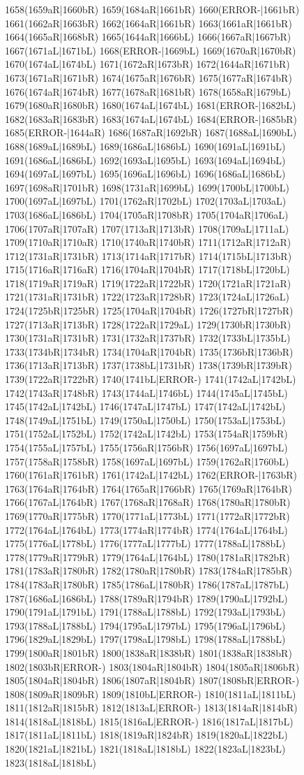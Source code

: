 1658(1659aR|1660bR) 1659(1684aR|1661bR) 1660(ERROR-|1661bR) 1661(1662aR|1663bR) 1662(1664aR|1661bR) 1663(1661aR|1661bR) 1664(1665aR|1668bR) 1665(1644aR|1666bL) 1666(1667aR|1667bR) 1667(1671aL|1671bL) 1668(ERROR-|1669bL) 1669(1670aR|1670bR) 1670(1674aL|1674bL) 1671(1672aR|1673bR) 1672(1644aR|1671bR) 1673(1671aR|1671bR) 1674(1675aR|1676bR) 1675(1677aR|1674bR) 1676(1674aR|1674bR) 1677(1678aR|1681bR) 1678(1658aR|1679bL) 1679(1680aR|1680bR) 1680(1674aL|1674bL) 1681(ERROR-|1682bL) 1682(1683aR|1683bR) 1683(1674aL|1674bL) 1684(ERROR-|1685bR) 1685(ERROR-|1644aR) 1686(1687aR|1692bR) 1687(1688aL|1690bL) 1688(1689aL|1689bL) 1689(1686aL|1686bL) 1690(1691aL|1691bL) 1691(1686aL|1686bL) 1692(1693aL|1695bL) 1693(1694aL|1694bL) 1694(1697aL|1697bL) 1695(1696aL|1696bL) 1696(1686aL|1686bL) 1697(1698aR|1701bR) 1698(1731aR|1699bL) 1699(1700bL|1700bL) 1700(1697aL|1697bL) 1701(1762aR|1702bL) 1702(1703aL|1703aL) 1703(1686aL|1686bL) 1704(1705aR|1708bR) 1705(1704aR|1706aL) 1706(1707aR|1707aR) 1707(1713aR|1713bR) 1708(1709aL|1711aL) 1709(1710aR|1710aR) 1710(1740aR|1740bR) 1711(1712aR|1712aR) 1712(1731aR|1731bR) 1713(1714aR|1717bR) 1714(1715bL|1713bR) 1715(1716aR|1716aR) 1716(1704aR|1704bR) 1717(1718bL|1720bL) 1718(1719aR|1719aR) 1719(1722aR|1722bR) 1720(1721aR|1721aR) 1721(1731aR|1731bR) 1722(1723aR|1728bR) 1723(1724aL|1726aL) 1724(1725bR|1725bR) 1725(1704aR|1704bR) 1726(1727bR|1727bR) 1727(1713aR|1713bR) 1728(1722aR|1729aL) 1729(1730bR|1730bR) 1730(1731aR|1731bR) 1731(1732aR|1737bR) 1732(1733bL|1735bL) 1733(1734bR|1734bR) 1734(1704aR|1704bR) 1735(1736bR|1736bR) 1736(1713aR|1713bR) 1737(1738bL|1731bR) 1738(1739bR|1739bR) 1739(1722aR|1722bR) 1740(1741bL|ERROR-) 1741(1742aL|1742bL) 1742(1743aR|1748bR) 1743(1744aL|1746bL) 1744(1745aL|1745bL) 1745(1742aL|1742bL) 1746(1747aL|1747bL) 1747(1742aL|1742bL) 1748(1749aL|1751bL) 1749(1750aL|1750bL) 1750(1753aL|1753bL) 1751(1752aL|1752bL) 1752(1742aL|1742bL) 1753(1754aR|1759bR) 1754(1755aL|1757bL) 1755(1756aR|1756bR) 1756(1697aL|1697bL) 1757(1758aR|1758bR) 1758(1697aL|1697bL) 1759(1762aR|1760bL) 1760(1761aR|1761bR) 1761(1742aL|1742bL) 1762(ERROR-|1763bR) 1763(1764aR|1764bR) 1764(1765aR|1766bR) 1765(1769aR|1764bR) 1766(1767aL|1764bR) 1767(1768aR|1768aR) 1768(1780aR|1780bR) 1769(1770aR|1775bR) 1770(1771aL|1773bL) 1771(1772aR|1772bR) 1772(1764aL|1764bL) 1773(1774aR|1774bR) 1774(1764aL|1764bL) 1775(1776aL|1778bL) 1776(1777aL|1777bL) 1777(1788aL|1788bL) 1778(1779aR|1779bR) 1779(1764aL|1764bL) 1780(1781aR|1782bR) 1781(1783aR|1780bR) 1782(1780aR|1780bR) 1783(1784aR|1785bR) 1784(1783aR|1780bR) 1785(1786aL|1780bR) 1786(1787aL|1787bL) 1787(1686aL|1686bL) 1788(1789aR|1794bR) 1789(1790aL|1792bL) 1790(1791aL|1791bL) 1791(1788aL|1788bL) 1792(1793aL|1793bL) 1793(1788aL|1788bL) 1794(1795aL|1797bL) 1795(1796aL|1796bL) 1796(1829aL|1829bL) 1797(1798aL|1798bL) 1798(1788aL|1788bL) 1799(1800aR|1801bR) 1800(1838aR|1838bR) 1801(1838aR|1838bR) 1802(1803bR|ERROR-) 1803(1804aR|1804bR) 1804(1805aR|1806bR) 1805(1804aR|1804bR) 1806(1807aR|1804bR) 1807(1808bR|ERROR-) 1808(1809aR|1809bR) 1809(1810bL|ERROR-) 1810(1811aL|1811bL) 1811(1812aR|1815bR) 1812(1813aL|ERROR-) 1813(1814aR|1814bR) 1814(1818aL|1818bL) 1815(1816aL|ERROR-) 1816(1817aL|1817bL) 1817(1811aL|1811bL) 1818(1819aR|1824bR) 1819(1820aL|1822bL) 1820(1821aL|1821bL) 1821(1818aL|1818bL) 1822(1823aL|1823bL) 1823(1818aL|1818bL) 